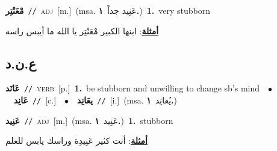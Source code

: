 \documentclass[10pt,a4paper,twoside]{article} %
\begin{document}
\begin{multicols}{2}
{\setlength\topsep{0pt}\textbf{\foreignlanguage{arabic}{مْعَنْتِر}}\ {\color{gray}\texttt{//}\color{black}}\ \textsc{adj}\ [m.]\ \color{gray}(msa. \foreignlanguage{arabic}{عَنِيد جداً}~\foreignlanguage{arabic}{\textbf{١.}})\color{black}\ \textbf{1.}~very stubborn\  \begin{flushright}\color{gray}\foreignlanguage{arabic}{\textbf{\underline{\foreignlanguage{arabic}{أمثلة}}}: ابنها الكبير مْعَنْتِر يا الله ما أيبس راسه}\end{flushright}\color{black}} \vspace{2mm}

\vspace{-3mm}
\subsection*{\color{blue}\foreignlanguage{arabic}{ع.ن.د}\color{blue}{}} 

{\setlength\topsep{0pt}\textbf{\foreignlanguage{arabic}{عَانَد}}\ {\color{gray}\texttt{//}\color{black}}\ \textsc{verb}\ [p.]\ \textbf{1.}~be stubborn and unwilling to change sb's mind\ \ $\bullet$\ \ \setlength\topsep{0pt}\textbf{\foreignlanguage{arabic}{عَانِد}}\ {\color{gray}\texttt{//}\color{black}}\ [c.]\ \ $\bullet$\ \ \setlength\topsep{0pt}\textbf{\foreignlanguage{arabic}{يعَانِد}}\ {\color{gray}\texttt{//}\color{black}}\ [i.]\ \color{gray}(msa. \foreignlanguage{arabic}{يُعانِد}~\foreignlanguage{arabic}{\textbf{١.}})\color{black}\ } \vspace{2mm}

{\setlength\topsep{0pt}\textbf{\foreignlanguage{arabic}{عَنِيد}}\ {\color{gray}\texttt{//}\color{black}}\ \textsc{adj}\ [m.]\ \color{gray}(msa. \foreignlanguage{arabic}{عَنِيد}~\foreignlanguage{arabic}{\textbf{١.}})\color{black}\ \textbf{1.}~stubborn\  \begin{flushright}\color{gray}\foreignlanguage{arabic}{\textbf{\underline{\foreignlanguage{arabic}{أمثلة}}}: أنت كثير عَنِيدِة وراسك يابس للعلم}\end{flushright}\color{black}} \vspace{2mm}


\end{multicols}
\end{document}

